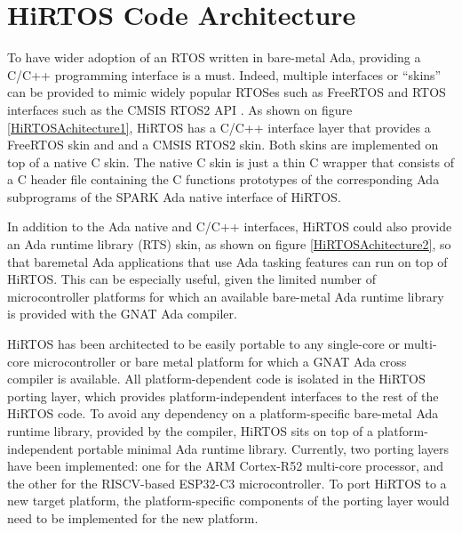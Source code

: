 \documentclass[11pt,letterpaper,twoside,openany]{book}
\begin{document}
\section{HiRTOS Code Architecture}

To have wider adoption of an RTOS written in bare-metal Ada, providing a C/C++ programming interface
is a must. Indeed, multiple interfaces or ``skins'' can be provided to mimic widely popular
RTOSes such as FreeRTOS \cite{freeRTOS} and RTOS interfaces such as the CMSIS RTOS2 API \cite{cmsisRTOS}.
As shown on figure \ref{HiRTOSAchitecture1}, HiRTOS has a C/C++ interface layer that provides
a FreeRTOS skin and and a CMSIS RTOS2 skin. Both skins are implemented on top of a native C skin.
The native C skin is just a thin C wrapper that consists of a C header file containing the C
functions prototypes of the corresponding Ada subprograms of the SPARK Ada native interface of HiRTOS.

In addition to the Ada native and C/C++ interfaces, HiRTOS could also provide an Ada runtime library (RTS) skin,
as shown on figure \ref{HiRTOSAchitecture2}, so that baremetal Ada applications that use Ada tasking
features can run on top of HiRTOS. This can be especially useful, given the limited number of
microcontroller platforms for which an available bare-metal Ada runtime library is provided with the
GNAT Ada compiler.

HiRTOS has been architected to be easily portable to any single-core or multi-core microcontroller or
bare metal platform for which a GNAT Ada cross compiler is available. All platform-dependent code is
isolated in the HiRTOS porting layer, which provides platform-independent interfaces to the rest of
the HiRTOS code.
To avoid any dependency on a platform-specific bare-metal Ada runtime library, provided by the
compiler, HiRTOS sits on top of a platform-independent portable minimal Ada runtime library.
Currently, two porting layers have been implemented: one for the ARM Cortex-R52 multi-core processor,
and the other for the RISCV-based ESP32-C3 microcontroller. To port HiRTOS to a new target platform,
the platform-specific components of the porting layer would need to be implemented for the new platform.
\end{document}
